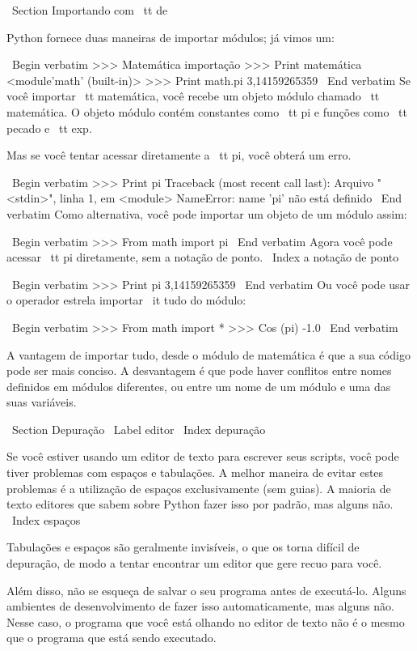 \documentclass[10pt]{book}
\begin{document}
\begin {itemize}
{\ Section {Importando com {\ tt de}}

Python fornece duas maneiras de importar módulos; já vimos um:

\ Begin {verbatim}
>>> Matemática importação
>>> Print matemática
<module'math' (built-in)>
>>> Print math.pi
3,14159265359
\ End {verbatim}
%
Se você importar {\ tt matemática}, você recebe um objeto módulo chamado {\ tt matemática}.
O objeto módulo contém constantes como {\ tt pi} e funções
como {\ tt pecado} e {\ tt exp}.

Mas se você tentar acessar diretamente a {\ tt pi}, você obterá um erro.

\ Begin {verbatim}
>>> Print pi
Traceback (most recent call last):
  Arquivo "<stdin>", linha 1, em <module>
NameError: name 'pi' não está definido
\ End {verbatim}
%
Como alternativa, você pode importar um objeto de um módulo assim:

\ Begin {verbatim}
>>> From math import pi
\ End {verbatim}
%
Agora você pode acessar {\ tt pi} diretamente, sem a notação de ponto.
\ Index {} a notação de ponto

\ Begin {verbatim}
>>> Print pi
3,14159265359
\ End {verbatim}
%
Ou você pode usar o operador estrela importar {\ it tudo} do
módulo:

\ Begin {verbatim}
>>> From math import *
>>> Cos (pi)
-1.0
\ End {verbatim}

A vantagem de importar tudo, desde o módulo de matemática é que a sua
código pode ser mais conciso. A desvantagem é que pode haver
conflitos entre nomes definidos em módulos diferentes, ou entre
um nome de um módulo e uma das suas variáveis.


\ Section {} Depuração
\ Label {editor}
\ Index {depuração}

Se você estiver usando um editor de texto para escrever seus scripts, você pode
tiver problemas com espaços e tabulações. A melhor maneira de evitar
estes problemas é a utilização de espaços exclusivamente (sem guias). A maioria de texto
editores que sabem sobre Python fazer isso por padrão, mas alguns
não.
\ Index {espaços}

Tabulações e espaços são geralmente invisíveis, o que os torna
difícil de depuração, de modo a tentar encontrar um editor que gere recuo
para você.

Além disso, não se esqueça de salvar o seu programa antes de executá-lo. Alguns
ambientes de desenvolvimento de fazer isso automaticamente, mas alguns não.
Nesse caso, o programa que você está olhando no editor de texto
não é o mesmo que o programa que está sendo executado.

}
\end{itemize}
\end{document}
